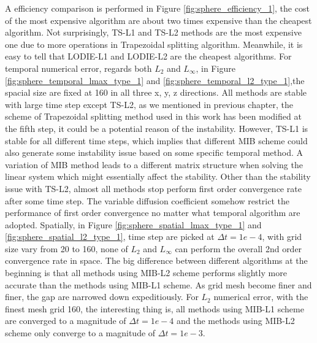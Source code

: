 \documentclass[dissertation]{uathesis}
\begin{document}
\begin{body}
\begin{flushleft}
\hspace{1cm} A efficiency comparison is performed in Figure \ref{fig:sphere_efficiency_1}, the cost of the most expensive algorithm are about two times expensive than the cheapest algorithm. Not surprisingly, TS-L1 and TS-L2 methods are the most expensive one due to more operations in Trapezoidal splitting algorithm. Meanwhile, it is easy to tell that LODIE-L1 and LODIE-L2 are the cheapest algorithms. For temporal numerical error, regards both $L_2$ and $L_{\infty}$, in Figure \ref{fig:sphere_temporal_lmax_type_1} and \ref{fig:sphere_temporal_l2_type_1},the spacial size are fixed at 160 in all three x, y, z directions. All methods are stable with large time step except TS-L2, as we mentioned in previous chapter, the scheme of Trapezoidal splitting method used in this work has been modified at the fifth step, it could be a potential reason of the instability. However, TS-L1 is stable for all different time steps, which implies that different MIB scheme could also generate some instability issue based on some specific temporal method. A variation of MIB method leads to a different matrix structure when solving the linear system which might essentially affect the stability. Other than the stability issue with TS-L2, almost all methods stop perform first order convergence rate after some time step. The variable diffusion coefficient somehow restrict the performance of first order convergence no matter what temporal algorithm are adopted. Spatially, in Figure \ref{fig:sphere_spatial_lmax_type_1} and \ref{fig:sphere_spatial_l2_type_1}, time step are picked at $\Delta{t}=1e-4$, with grid size vary from 20 to 160, none of $L_2$ and $L_{\infty}$ can perform the overall 2nd order convergence rate in space. The big difference between different algorithms at the beginning is that all methods using MIB-L2 scheme performs slightly more accurate than the methods using MIB-L1 scheme. As grid mesh become finer and finer, the gap are narrowed down expeditiously. For $L_2$ numerical error, with the finest mesh grid 160, the interesting thing is, all methods using MIB-L1 scheme are converged to a magnitude of $\Delta{t}=1e-4$ and the methods using MIB-L2 scheme only converge to a magnitude of $\Delta{t}=1e-3$.




\end{flushleft}
\end{body}
\end{document}
